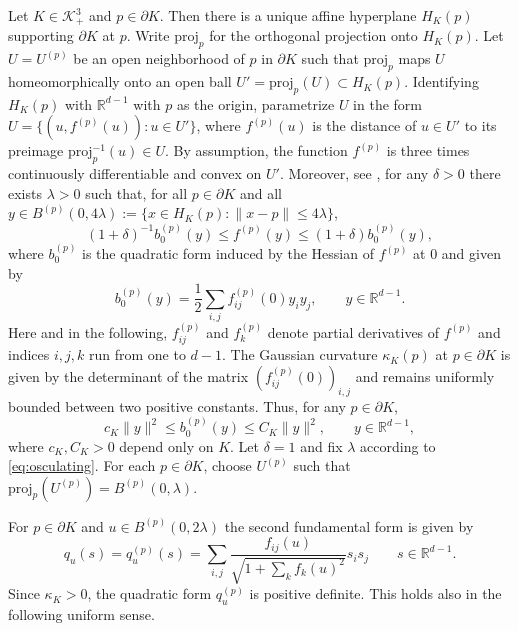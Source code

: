 \documentclass[a4paper,12pt,reqno]{amsart}
\theoremstyle{definition}
\newcommand{\IR}{\mathbb{R}}
\newcommand{\cK}{\mathcal{K}}
\newcommand{\proj}{\mathrm{proj}}
\begin{document}
Let $K\in \cK^3_+$ and $p\in \partial K$. Then there is a unique affine hyperplane $H_K(p)$ supporting $\partial K$ at $p$. Write $\proj_p$ for the orthogonal projection onto $H_K(p)$. Let $U=U^{(p)}$ be an open neighborhood of $p$ in $\partial K$ such that $\proj_p$ maps $U$ homeomorphically onto an open ball $U'=\proj_p(U)\subset H_K(p)$.  Identifying $H_K(p)$ with $\IR^{d-1}$ with $p$ as the origin, parametrize $U$ in the form $U=\{(u,f^{(p)}(u))\colon u\in U'\}$, where $f^{(p)}(u)$ is the distance of $u\in U'$ to its preimage $\proj_p^{-1}(u)\in U$. By assumption, the function $f^{(p)}$ is three times continuously differentiable and convex on $U'$. Moreover, see \cite[Section~5]{Rei05}, for any $\delta>0$ there exists $\lambda>0$ such that, for all $p\in \partial K$ and all $y\in B^{(p)}(0,4\lambda):=\{x\in H_K(p)\colon \|x-p\|\le 4\lambda\}$,
\begin{equation} \label{eq:osculating}
(1+\delta)^{-1}b_0^{(p)}(y)
\le f^{(p)}(y)
\le (1+\delta)b_0^{(p)}(y),
\end{equation}
where $b_0^{(p)}$ is the quadratic form induced by the Hessian of $f^{(p)}$ at $0$ and given by
\[
b_0^{(p)}(y)=\frac{1}{2}\sum_{i,j}f_{ij}^{(p)}(0)y_iy_j,\qquad y\in \IR^{d-1}.
\]
Here and in the following, $f^{(p)}_{ij}$ and $f^{(p)}_k$ denote partial derivatives of $f^{(p)}$ and indices $i,j,k$ run from one to $d-1$. The Gaussian curvature $\kappa_K(p)$ at $p\in \partial K$ is given by the determinant of the matrix $(f_{ij}^{(p)}(0))_{i,j}$ and remains uniformly bounded between two positive constants. Thus, for any $p\in \partial K$,
\begin{equation} \label{eq:paraboloid-lower}
c_K \|y\|^2
\le b_0^{(p)}(y)
\le C_K \|y\|^2,\qquad y\in \IR^{d-1},
\end{equation}
where $c_K,C_K>0$ depend only on $K$. Let $\delta=1$ and fix $\lambda$ according to \eqref{eq:osculating}. For each $p\in \partial K$, choose $U^{(p)}$ such that $\proj_{p}(U^{(p)})=B^{(p)}(0,\lambda)$. 

For $p\in \partial K$ and $u\in B^{(p)}(0,2\lambda)$ the second fundamental form is given by 
\[
q_{u}(s)
=q_{u}^{(p)}(s)
=\sum_{i,j}\frac{f_{ij}(u)}{\sqrt{1+\sum_{k}f_k(u)^2}}s_i s_j\qquad s\in \IR^{d-1}.
\]
Since $\kappa_K>0$, the quadratic form $q_{u}^{(p)}$ is positive definite. This holds also in the following uniform sense. 
\end{document}
